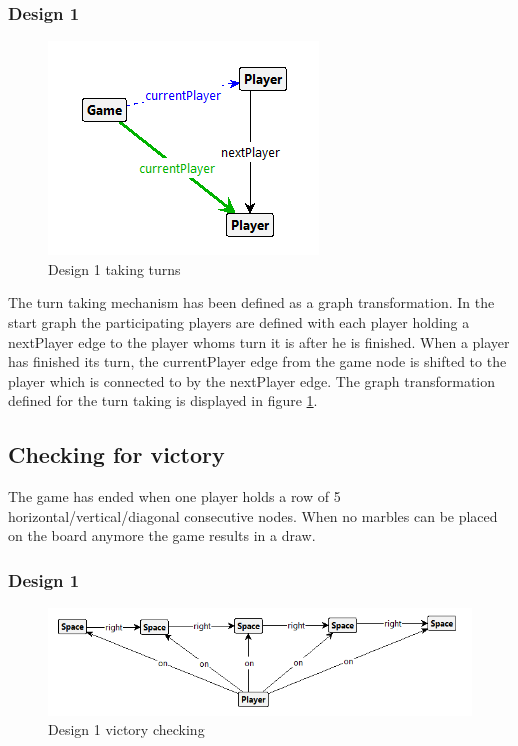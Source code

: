 \subsubsection{Design 1}
\begin{figure}[!h]
    \centering
    \includegraphics[scale=0.5,clip]{Images/turn1.png}
    \caption{Design 1 taking turns}
    \label{fig:turn1}
\end{figure}

The turn taking mechanism has been defined as a graph transformation.
In the start graph the participating players are defined with each player holding a nextPlayer edge to the player whoms turn it is after he is finished.
When a player has finished its turn, the currentPlayer edge from the game node is shifted to the player which is connected to by the nextPlayer edge.
The graph transformation defined for the turn taking is displayed in figure \ref{fig:turn1}.

\subsection{Checking for victory}
The game has ended when one player holds a row of 5 horizontal/vertical/diagonal consecutive nodes.
When no marbles can be placed on the board anymore the game results in a draw.

\subsubsection{Design 1}
\begin{figure}[!h]
    \centering
    \includegraphics[scale=0.5,clip]{Images/endgame1.png}
    \caption{Design 1 victory checking}
    \label{fig:endgame1}
\end{figure}

